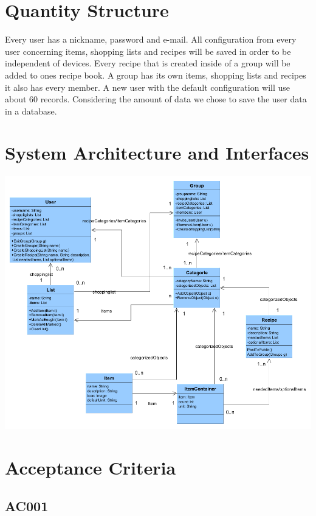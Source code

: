 \documentclass[12pt]{article}
\theoremstyle{definition}
\begin{document}
\section{Quantity Structure}

Every user has a nickname, password and e-mail. All configuration from every user concerning items, shopping lists and recipes will be saved in order to be independent of devices. Every recipe that is created inside of a group will be added to ones recipe book. A group has its own items, shopping lists and recipes it also has every member. A new user with the default configuration will use about 60 records. Considering the amount of data we chose to save the user data in a database. 

\pagebreak

\section{System Architecture and Interfaces}

\includegraphics[scale=.5]{Images/UMLClassDiagram.png}

\pagebreak

\section{Acceptance Criteria}

\subsection{AC001}
\end{document}
